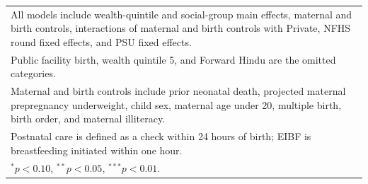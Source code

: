 {\begin{tabular}{l*{5}{c}}
\multicolumn{6}{l}{\footnotesize All models include wealth-quintile and social-group main effects, maternal and birth controls, interactions of maternal and birth controls with Private, NFHS round fixed effects, and PSU fixed effects.}\\
\multicolumn{6}{l}{\footnotesize Public facility birth, wealth quintile 5, and Forward Hindu are the omitted categories.}\\
\multicolumn{6}{l}{\footnotesize Maternal and birth controls include prior neonatal death, projected maternal prepregnancy underweight, child sex, maternal age under 20, multiple birth, birth order, and maternal illiteracy.}\\
\multicolumn{6}{l}{\footnotesize Postnatal care is defined as a check within 24 hours of birth; EIBF is breastfeeding initiated within one hour.}\\
\multicolumn{6}{l}{\footnotesize $^{*}p<0.10$, $^{**}p<0.05$, $^{***}p<0.01$.}\\
\end{tabular}
}
